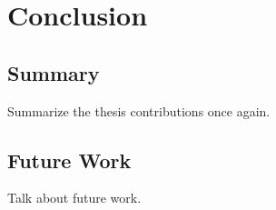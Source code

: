 
\chapter{Conclusion}
\label{sec:conclusion}


\section{Summary}
Summarize the thesis contributions once again.

\section{Future Work}
Talk about future work.
